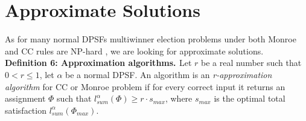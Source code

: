 \section{Approximate Solutions}

As for many normal DPSFs multiwinner election problems under both Monroe and CC rules are NP-hard \cite{3, 4, 2}, we are looking for approximate solutions.
\\

\noindent
\textbf{Definition 6: Approximation algorithms. \cite{1}} \hspace{.1in} Let $r$ be a real number such that $0 < r \leq 1$, let $\alpha$ be a normal DPSF. An algorithm is an \textit{r-approximation algorithm} for CC or Monroe problem if for every correct input it returns an assignment $\Phi$ such that $l^{\alpha}_{sum}(\Phi) \geq r \cdot s_{max}$, where $s_{max}$ is the optimal total satisfaction $l^{\alpha}_{sum}(\Phi_{max})$.
\\
